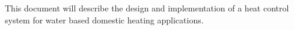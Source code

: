 This document will describe the design and implementation of a heat
control system for water based domestic heating applications. 
